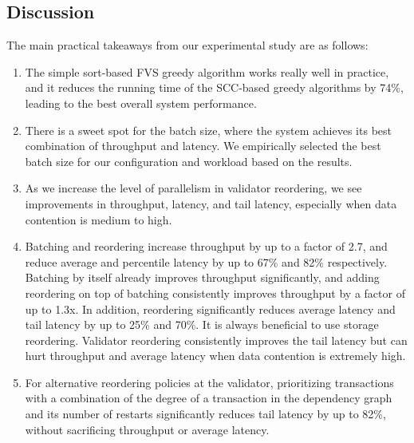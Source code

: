 






\subsection{Discussion}

The main practical takeaways from our experimental study are as follows:
\vspace{-.5em}
\begin{enumerate}[leftmargin=*]
\item The simple sort-based FVS greedy algorithm works really well in practice, and it reduces the running time of the SCC-based greedy algorithms by 74\%, leading to the best overall system performance. 
\item There is a sweet spot for the batch size, where the system achieves its best combination of throughput and latency. We empirically selected the best batch size for our configuration and workload based on the results.
\item As we increase the level of parallelism in validator reordering, we see improvements in throughput, latency, and tail latency, especially when data contention is medium to high.
\item Batching and reordering increase throughput by up to a factor of 2.7, and reduce average and percentile latency by up to 67\% and 82\% respectively.
Batching by itself already improves throughput significantly, and adding reordering on top of batching consistently improves throughput by a factor of up to 1.3x. In addition, reordering significantly reduces average latency and tail latency by up to 25\% and 70\%. It is always beneficial to use storage reordering. Validator reordering consistently improves the tail latency but can hurt throughput and average latency when data contention is extremely high.
\item For alternative reordering policies at the validator, prioritizing transactions with a combination of the degree of a transaction in the dependency graph and its number of restarts significantly reduces tail latency by up to 82\%, without sacrificing throughput or average latency.

\end{enumerate}
